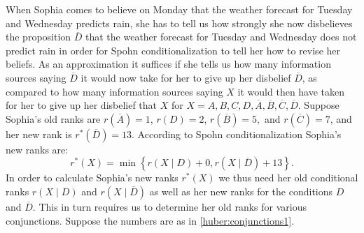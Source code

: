 When Sophia comes to believe on Monday that the weather forecast for Tuesday and Wednesday predicts rain, she has to tell us how strongly she now disbelieves the proposition $\overline{D}$ that the weather forecast for Tuesday and Wednesday does not predict rain in order for Spohn conditionalization to tell her how to revise her beliefs. As an approximation it suffices if she tells us how many information sources saying $\overline{D}$ it would now take for her to give up her disbelief $\overline{D}$, as compared to how many information sources saying $X$ it would then have taken for her to give up her disbelief that $X$ for $X=A,B,C,D,\overline{A},\overline{B},\overline{C},\overline{D}$. Suppose Sophia's old ranks are $r(\overline{A})=1$, $r(D)=2$, $r(\overline{B})=5,$ and $r(\overline{C})=7$, and her new rank is $r^*(\overline{D})=13$. According to Spohn conditionalization Sophia's new ranks are:%
$$r^*\left(X\right)=\min\left\{r\left(X\mid D\right)+0,r\left(X\mid\overline{D}\right)+13\right\}.$$
In order to calculate Sophia's new ranks $r^*(X)$ we thus need her old conditional ranks $r(X\mid D)$ and $r(X\mid\overline{D})$ as well as her new ranks for the conditions $D$ and $\overline{D}$. This in turn requires us to determine her old ranks for various conjunctions. Suppose %
the numbers are as in \autoref{huber:conjunctions1}.
